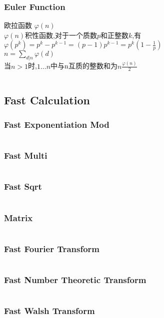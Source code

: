 \documentclass[a4paper,10pt]{article}
\begin{document}
				\subsubsection{Euler Function}
					欧拉函数 $\varphi(n)$\\
					
					$\varphi(n)$积性函数,对于一个质数$p$和正整数$k$,有\\ 
					$\varphi(p^k) = p^k - p^{k-1} = (p - 1)p^{k - 1} = p^k(1 - \frac{1}{p})$\\
					
					$n = \sum_{d|n}\varphi(d)$\\
					当$n > 1$时,$1 … n$中与n互质的整数和为$n$$\frac{\varphi(n)}{2}$\\
					\inputminted[breaklines]{c++}{Math/Euler.cc}
			
			\subsection{Fast Calculation}
				\subsubsection{Fast Exponentiation Mod}
					\inputminted[breaklines]{c++}{Math/Fast-Exponentiation-Mod.cc}
				\subsubsection{Fast Multi}
					\inputminted[breaklines]{c++}{Math/Fast-Multi.cc}
				\subsubsection{Fast Sqrt}
					\inputminted[breaklines]{c++}{Math/Fast-Sqrt.cc}
				\subsubsection{Matrix}
					\inputminted[breaklines]{c++}{Math/Matrix.cc}
				\subsubsection{Fast Fourier Transform}
					\inputminted[breaklines]{c++}{Math/FFT.cc}
				\subsubsection{Fast Number Theoretic Transform}
					\inputminted[breaklines]{c++}{Math/NTT.cc}
				\subsubsection{Fast Walsh Transform}
					\inputminted[breaklines]{c++}{Math/FWT.cc}
\end{document}
